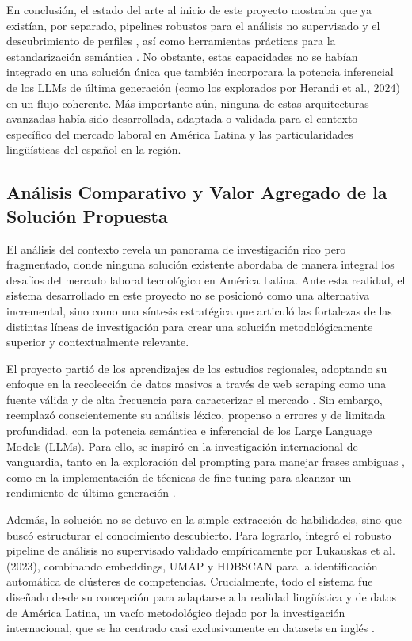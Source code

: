 En conclusión, el estado del arte al inicio de este proyecto mostraba que ya existían, por separado, pipelines robustos para el análisis no supervisado y el descubrimiento de perfiles \cite{lukauskas2023}, así como herramientas prácticas para la estandarización semántica \cite{kavargyris2025}. No obstante, estas capacidades no se habían integrado en una solución única que también incorporara la potencia inferencial de los LLMs de última generación (como los explorados por Herandi et al., 2024) en un flujo coherente. Más importante aún, ninguna de estas arquitecturas avanzadas había sido desarrollada, adaptada o validada para el contexto específico del mercado laboral en América Latina y las particularidades lingüísticas del español en la región.

\subsection{Análisis Comparativo y Valor Agregado de la Solución Propuesta}

El análisis del contexto revela un panorama de investigación rico pero fragmentado, donde ninguna solución existente abordaba de manera integral los desafíos del mercado laboral tecnológico en América Latina. Ante esta realidad, el sistema desarrollado en este proyecto no se posicionó como una alternativa incremental, sino como una síntesis estratégica que articuló las fortalezas de las distintas líneas de investigación para crear una solución metodológicamente superior y contextualmente relevante.

El proyecto partió de los aprendizajes de los estudios regionales, adoptando su enfoque en la recolección de datos masivos a través de web scraping como una fuente válida y de alta frecuencia para caracterizar el mercado \cite{aguilera2018, martinez2024, rubio2024}. Sin embargo, reemplazó conscientemente su análisis léxico, propenso a errores y de limitada profundidad, con la potencia semántica e inferencial de los Large Language Models (LLMs). Para ello, se inspiró en la investigación internacional de vanguardia, tanto en la exploración del prompting para manejar frases ambiguas \cite{nguyen2024}, como en la implementación de técnicas de fine-tuning para alcanzar un rendimiento de última generación \cite{herandi2024}.

Además, la solución no se detuvo en la simple extracción de habilidades, sino que buscó estructurar el conocimiento descubierto. Para lograrlo, integró el robusto pipeline de análisis no supervisado validado empíricamente por Lukauskas et al. (2023), combinando embeddings, UMAP y HDBSCAN para la identificación automática de clústeres de competencias. Crucialmente, todo el sistema fue diseñado desde su concepción para adaptarse a la realidad lingüística y de datos de América Latina, un vacío metodológico dejado por la investigación internacional, que se ha centrado casi exclusivamente en datasets en inglés \cite{herandi2024}.

